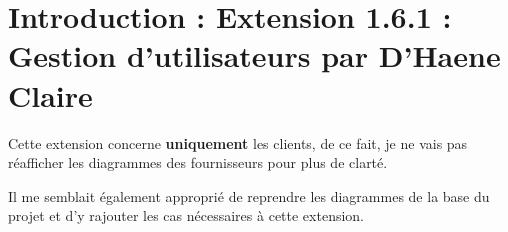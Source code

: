 \section{Introduction : Extension 1.6.1 : Gestion d’utilisateurs par D’Haene Claire}

Cette extension concerne \textbf{uniquement} les clients, de ce fait, je ne vais pas réafficher les diagrammes des fournisseurs pour plus de clarté.
\newline
\begin{flushleft}
Il me semblait également approprié de reprendre les diagrammes de la base du projet et d’y rajouter les cas nécessaires à cette extension.
 \end{flushleft} 

